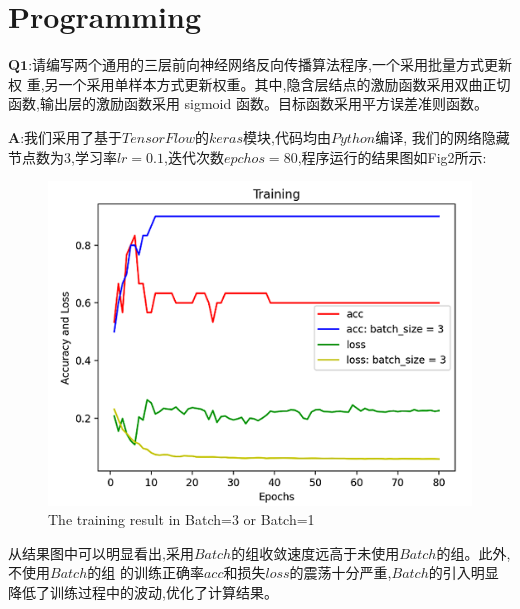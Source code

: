\documentclass[homework]{IEEEtran}
\begin{document}
\section{Programming}
\begin{CJK}{UTF8}{gkai}

$\mathbf{Q1}$:请编写两个通用的三层前向神经网络反向传播算法程序,一个采用批量方式更新权
重,另一个采用单样本方式更新权重。其中,隐含层结点的激励函数采用双曲正切
函数,输出层的激励函数采用 sigmoid 函数。目标函数采用平方误差准则函数。 \par
$\mathbf{A}$:我们采用了基于$Tensor Flow$的$keras$模块,代码均由$Python$编译,
我们的网络隐藏节点数为3,学习率$lr=0.1$,迭代次数$epchos=80$,程序运行的结果图如Fig2所示:
\begin{figure}[htb]
\centerline{\includegraphics{Images/fig3.png}}
\caption{The training result in Batch=3 or Batch=1}
\label{fig3}
\end{figure}
从结果图中可以明显看出,采用$Batch$的组收敛速度远高于未使用$Batch$的组。此外,不使用$Batch$的组
的训练正确率$acc$和损失$loss$的震荡十分严重,$Batch$的引入明显降低了训练过程中的波动,优化了计算结果。


\end{CJK}
\end{document}

